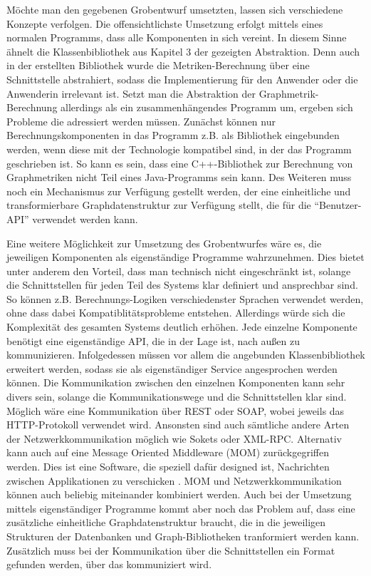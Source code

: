 \documentclass[a4paper,12pt,ngerman,chapterprefix=false,listof=totoc,bibliography=totoc]{scrreprt}
\begin{document}
{{{Möchte man den gegebenen Grobentwurf umsetzten, lassen sich verschiedene Konzepte verfolgen. Die offensichtlichste Umsetzung erfolgt mittels eines normalen Programms, dass alle Komponenten in sich vereint. In diesem Sinne ähnelt die Klassenbibliothek aus Kapitel 3 der gezeigten Abstraktion. Denn auch in der erstellten Bibliothek wurde die Metriken-Berechnung über eine Schnittstelle abstrahiert, sodass die Implementierung für den Anwender oder die Anwenderin irrelevant ist. Setzt man die Abstraktion der Graphmetrik-Berechnung allerdings als ein zusammenhängendes Programm um, ergeben sich Probleme die adressiert werden müssen. Zunächst können nur Berechnungskomponenten in das Programm z.B. als Bibliothek eingebunden werden, wenn diese mit der Technologie kompatibel sind, in der das Programm geschrieben ist. So kann es sein, dass eine C++-Bibliothek zur Berechnung von Graphmetriken nicht Teil eines Java-Programms sein kann. Des Weiteren muss noch ein Mechanismus zur Verfügung gestellt werden, der eine einheitliche und transformierbare Graphdatenstruktur zur Verfügung stellt, die für die "`Benutzer-API"' verwendet werden kann.

Eine weitere Möglichkeit zur Umsetzung des Grobentwurfes wäre es, die jeweiligen Komponenten als eigenständige Programme wahrzunehmen. Dies bietet unter anderem den Vorteil, dass man technisch nicht eingeschränkt ist, solange die Schnittstellen für jeden Teil des Systems klar definiert und ansprechbar sind. So können z.B. Berechnungs-Logiken verschiedenster Sprachen verwendet werden, ohne dass dabei Kompatiblitätsprobleme entstehen. Allerdings würde sich die Komplexität des gesamten Systems deutlich erhöhen. Jede einzelne Komponente benötigt eine eigenständige API, die in der Lage ist, nach außen zu kommunizieren. Infolgedessen müssen vor allem die angebunden Klassenbibliothek erweitert werden, sodass sie als eigenständiger Service angesprochen werden können. Die Kommunikation zwischen den einzelnen Komponenten kann sehr divers sein, solange die Kommunikationswege und die Schnittstellen klar sind. Möglich wäre eine Kommunikation über REST oder SOAP, wobei jeweils das HTTP-Protokoll verwendet wird. Ansonsten sind auch sämtliche andere Arten der Netzwerkkommunikation möglich wie Sokets oder XML-RPC. \cite{balzert_lehrbuch_2011} Alternativ kann auch auf eine Message Oriented Middleware (MOM) zurückgegriffen werden. Dies ist eine Software, die speziell dafür designed ist, Nachrichten zwischen Applikationen zu verschicken \cite{curry_message-oriented_2005}. MOM und Netzwerkkommunikation können auch beliebig miteinander kombiniert werden. Auch bei der Umsetzung mittels eigenständiger Programme kommt aber noch das Problem auf, dass eine zusätzliche einheitliche Graphdatenstruktur braucht, die in die jeweiligen Strukturen der Datenbanken und Graph-Bibliotheken tranformiert werden kann. Zusätzlich muss bei der Kommunikation über die Schnittstellen ein Format gefunden werden, über das kommuniziert wird.
}
}}
\end{document}
